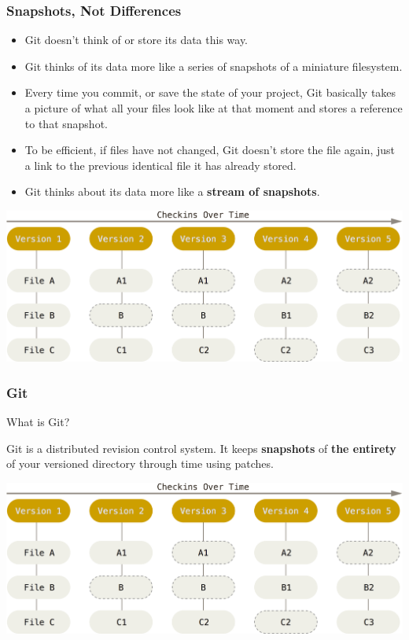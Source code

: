 \begin{frame}
  \frametitle{Snapshots, Not Differences}
  \begin{itemize}
   \item Git doesn’t think of or store its data this way. 
   \item Git thinks of its data more like a series of snapshots of a miniature filesystem. 
   \item Every time you commit, or save the state of your project, Git basically takes a picture of what all your files look like at that moment and stores a reference to that snapshot. 
   \item To be efficient, if files have not changed, Git doesn’t store the file again, just a link to the previous identical file it has already stored. 
   \item Git thinks about its data more like a \textbf{stream of snapshots}. 
  \end{itemize}
  
  \begin{center}
    \includegraphics[width=0.8\linewidth]{figures/git-snapshots}
  \end{center}
\end{frame}



\begin{frame}
  \frametitle{Git}

  What is Git?

  \vspace{1em}

  Git is a distributed revision control system. It keeps \textbf{snapshots} of
  \textbf{the entirety} of your versioned directory through time using
  patches.

  \vspace{1em}

  \begin{center}
    \includegraphics[width=0.8\linewidth]{figures/git-snapshots}
  \end{center}


\end{frame}


